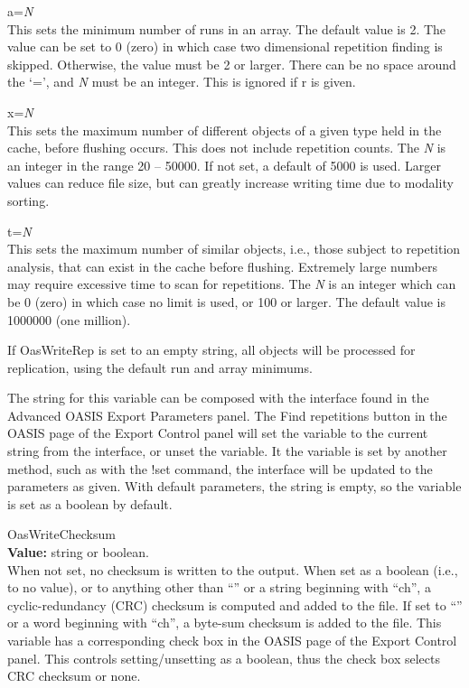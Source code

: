 \begin{description}
\begin{description}
\item{{\vt a}={\it N}}\\
This sets the minimum number of runs in an array.  The default value
is 2.  The value can be set to 0 (zero) in which case two dimensional
repetition finding is skipped.  Otherwise, the value must be 2 or
larger.  There can be no space around the `=', and {\it N} must be an
integer.  This is ignored if {\vt r} is given.

\item{{\vt x}={\it N}}\\
This sets the maximum number of different objects of a given type held
in the cache, before flushing occurs.  This does not include
repetition counts.  The {\it N} is an integer in the range 20 --
50000.  If not set, a default of 5000 is used.  Larger values can
reduce file size, but can greatly increase writing time due to
modality sorting.

\item{{\vt t}={\it N}}\\
This sets the maximum number of similar objects, i.e., those subject
to repetition analysis, that can exist in the cache before flushing. 
Extremely large numbers may require excessive time to scan for
repetitions.  The {\it N} is an integer which can be 0 (zero) in which
case no limit is used, or 100 or larger.  The default value is 1000000
(one million).
\end{description}

If {\et OasWriteRep} is set to an empty string, all objects will be
processed for replication, using the default run and array minimums.

The string for this variable can be composed with the interface found
in the {\cb Advanced OASIS Export Parameters} panel.  The {\cb Find
repetitions} button in the {\cb OASIS} page of the {\cb Export
Control} panel will set the variable to the current string from the
interface, or unset the variable.  It the variable is set by another
method, such as with the {\cb !set} command, the interface will be
updated to the parameters as given.  With default parameters, the
string is empty, so the variable is set as a boolean by default.

\label{OasWriteChecksum}
\item{\et OasWriteChecksum}\\
{\bf Value:} string or boolean.\\
When not set, no checksum is written to the output.  When set as a
boolean (i.e., to no value), or to anything other than ``{}'' or
a string beginning with ``{\vt ch}'', a cyclic-redundancy (CRC)
checksum is computed and added to the file.  If set to ``{}'' or
a word beginning with ``{\vt ch}'', a byte-sum checksum is added to
the file.  This variable has a corresponding check box in the {\cb
OASIS} page of the {\cb Export Control} panel.  This controls
setting/unsetting as a boolean, thus the check box selects CRC
checksum or none.


\end{description}
